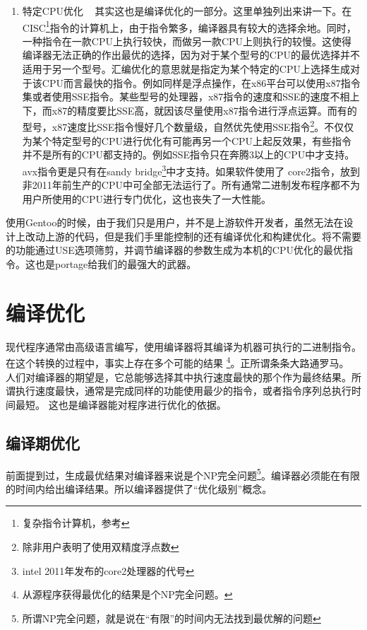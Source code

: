 \begin{enumerate}
\item 特定CPU优化	~	其实这也是编译优化的一部分。这里单独列出来讲一下。在CISC\footnote{复杂指令计算机，参考 }指令的计算机上，由于指令繁多，编译器具有较大的选择余地。同时，一种指令在一款CPU上执行较快，而做另一款CPU上则执行的较慢。这使得编译器无法正确的作出最优的选择，因为对于某个型号的CPU的最优选择并不适用于另一个型号。汇编优化的意思就是指定为某个特定的CPU上选择生成对于该CPU而言最快的指令。例如同样是浮点操作，在x86平台可以使用x87指令集或者使用SSE指令。某些型号的处理器，x87指令的速度和SSE的速度不相上下，而x87的精度要比SSE高，就因该尽量使用x87指令进行浮点运算。而有的型号，x87速度比SSE指令慢好几个数量级，自然优先使用SSE指令\footnote{除非用户表明了使用双精度浮点数}。不仅仅为某个特定型号的CPU进行优化有可能再另一个CPU上起反效果，有些指令并不是所有的CPU都支持的。例如SSE指令只在奔腾3以上的CPU中才支持。avx指令更是只有在sandy bridge\footnote{intel 2011年发布的core2处理器的代号}中才支持。如果软件使用了 core2指令，放到非2011年前生产的CPU中可全部无法运行了。所有通常二进制发布程序都不为用户所使用的CPU进行专门优化，这也丧失了一大性能。

\end{enumerate}

使用Gentoo的时候，由于我们只是用户，并不是上游软件开发者，虽然无法在设计上改动上游的代码，但是我们手里能控制的还有编译优化和构建优化。将不需要的功能通过USE选项筛剪，并调节编译器的参数生成为本机的CPU优化的最优指令。这也是portage给我们的最强大的武器。

\section{编译优化}

现代程序通常由高级语言编写，使用编译器将其编译为机器可执行的二进制指令。在这个转换的过程中，事实上存在多个可能的结果
\footnote{从源程序获得最优化的结果是个NP完全问题。}。正所谓条条大路通罗马。
人们对编译器的期望是，它总能够选择其中执行速度最快的那个作为最终结果。所谓执行速度最快，通常是完成同样的功能使用最少的指令，或者指令序列总执行时间最短。
这也是编译器能对程序进行优化的依据。

\subsection{编译期优化}
前面提到过，生成最优结果对编译器来说是个NP完全问题\footnote{所谓NP完全问题，就是说在“有限”的时间内无法找到最优解的问题}。编译器必须能在有限的时间内给出编译结果。所以编译器提供了“优化级别”概念。

